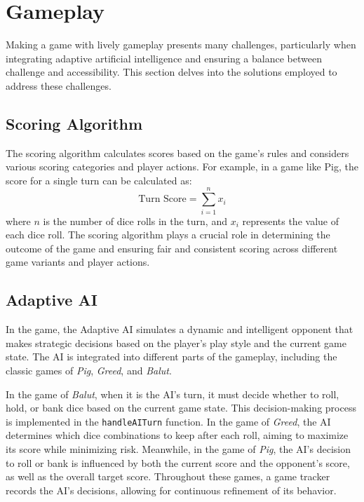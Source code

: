 \section{Gameplay}

Making a game with lively gameplay presents many challenges, particularly when integrating adaptive artificial intelligence and ensuring a balance between challenge and accessibility. This section delves into the solutions employed to address these challenges.

\subsection{Scoring Algorithm}

The scoring algorithm calculates scores based on the game's rules and considers various scoring categories and player actions. 
For example, in a game like Pig, the score for a single turn can be calculated as:
\begin{equation}
\text{Turn Score} = \sum_{i=1}^{n} x_i
\end{equation}
where $n$ is the number of dice rolls in the turn, and $x_i$ represents the value of each dice roll.
The scoring algorithm plays a crucial role in determining the outcome of the game and ensuring fair and consistent scoring across different game variants and player actions.

\subsection{Adaptive AI}
\label{subsec:adaptive_ai}

In the game, the Adaptive AI simulates a dynamic and intelligent opponent that makes strategic decisions based on the player's play style and the current game state. The AI is integrated into different parts of the gameplay, including the classic games of \emph{Pig}, \emph{Greed}, and \emph{Balut}.

In the game of \emph{Balut}, when it is the AI's turn, it must decide whether to roll, hold, or bank dice based on the current game state. This decision-making process is implemented in the \texttt{handleAITurn} function. In the game of \emph{Greed}, the AI determines which dice combinations to keep after each roll, aiming to maximize its score while minimizing risk. Meanwhile, in the game of \emph{Pig}, the AI's decision to roll or bank is influenced by both the current score and the opponent's score, as well as the overall target score. Throughout these games, a game tracker records the AI's decisions, allowing for continuous refinement of its behavior.

